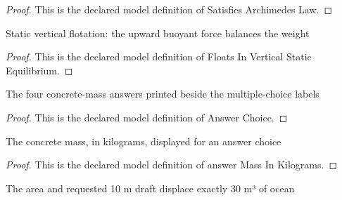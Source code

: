 \begin{proof}
  This is the declared model definition of Satisfies Archimedes Law.
\end{proof}
\begin{definition}
  \label{def:physics:phyx-mini-0386:phyxminiproblems-problemphyxmini0386-floatsinverticalstaticequilibrium}
  Static vertical flotation: the upward buoyant force balances the weight
\end{definition}
\begin{proof}
  This is the declared model definition of Floats In Vertical Static Equilibrium.
\end{proof}
\begin{definition}
  \label{def:physics:phyx-mini-0386:phyxminiproblems-problemphyxmini0386-answerchoice}
  The four concrete-mass answers printed beside the multiple-choice labels
\end{definition}
\begin{proof}
  This is the declared model definition of Answer Choice.
\end{proof}
\begin{definition}
  \label{def:physics:phyx-mini-0386:phyxminiproblems-problemphyxmini0386-answermassinkilograms}
  The concrete mass, in kilograms, displayed for an answer choice
\end{definition}
\begin{proof}
  This is the declared model definition of answer Mass In Kilograms.
\end{proof}
\begin{lemma}
  \label{lem:physics:phyx-mini-0386:phyxminiproblems-problemphyxmini0386-displacedoceanvolume-at-requesteddraft}
  The area and requested 10 m draft displace exactly 30 m³ of ocean
\end{lemma}
